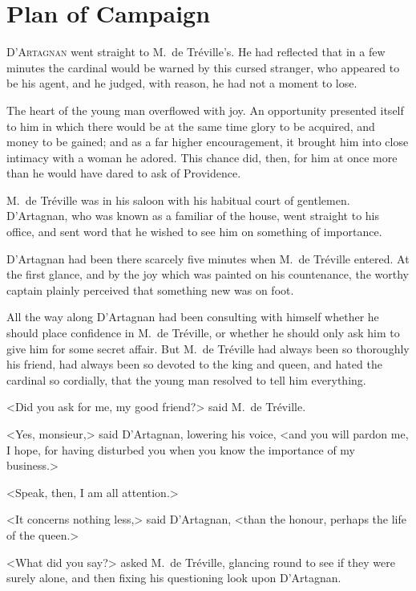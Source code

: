 
\chapter{Plan of Campaign} 
	
\lettrine{D}{'Artagnan} went straight to M.~de Tréville's. He had reflected that in a few minutes the cardinal would be warned by this cursed stranger, who appeared to be his agent, and he judged, with reason, he had not a moment to lose. 

\zz
The heart of the young man overflowed with joy. An opportunity presented itself to him in which there would be at the same time glory to be acquired, and money to be gained; and as a far higher encouragement, it brought him into close intimacy with a woman he adored. This chance did, then, for him at once more than he would have dared to ask of Providence. 

M.~de Tréville was in his saloon with his habitual court of gentlemen. D'Artagnan, who was known as a familiar of the house, went straight to his office, and sent word that he wished to see him on something of importance. 

D'Artagnan had been there scarcely five minutes when M.~de Tréville entered. At the first glance, and by the joy which was painted on his countenance, the worthy captain plainly perceived that something new was on foot. 

All the way along D'Artagnan had been consulting with himself whether he should place confidence in M.~de Tréville, or whether he should only ask him to give him  for some secret affair. But M.~de Tréville had always been so thoroughly his friend, had always been so devoted to the king and queen, and hated the cardinal so cordially, that the young man resolved to tell him everything. 

<Did you ask for me, my good friend?> said M.~de Tréville. 

<Yes, monsieur,> said D'Artagnan, lowering his voice, <and you will pardon me, I hope, for having disturbed you when you know the importance of my business.> 

<Speak, then, I am all attention.> 

<It concerns nothing less,> said D'Artagnan, <than the honour, perhaps the life of the queen.> 

<What did you say?> asked M.~de Tréville, glancing round to see if they were surely alone, and then fixing his questioning look upon D'Artagnan. 

